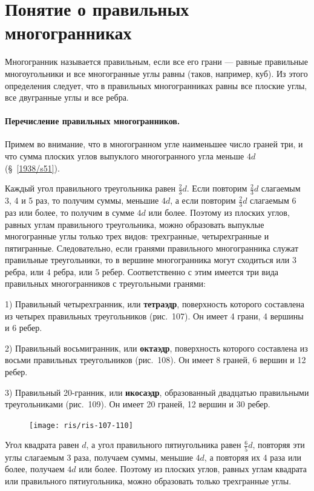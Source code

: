 \documentclass[twoside]{book}
\begin{document}
\section{Понятие о правильных многогранниках}

Многогранник называется правильным, если все его грани --- равные правильные многоугольники и все многогранные углы равны (таков, например, куб).
Из этого определения следует, что в правильных многогранниках равны все плоские углы, все двугранные углы и все ребра.

\paragraph{Перечисление правильных многогранников.}\label{1938/s97}
Примем во внимание, что в многогранном угле наименьшее число граней три, и что сумма плоских углов выпуклого многогранного угла меньше $4d$ (§~\ref{1938/s51}).

Каждый угол правильного треугольника равен $\tfrac23d$.
Если повторим  $\tfrac23d$ слагаемым 3, 4 и 5 раз, то получим суммы, меньшие $4d$, а если повторим  $\tfrac23d$ слагаемым 6 раз или более, то получим в сумме $4d$ или более.
Поэтому из плоских углов, равных углам правильного треугольника, можно образовать выпуклые многогранные углы только трех видов: трехгранные, четырехгранные и пятигранные.
Следовательно, если гранями правильного многогранника служат правильные треугольники, то в вершине многогранника могут сходиться или 3 ребра, или 4 ребра, или 5 ребер.
Соответственно с этим имеется три вида правильных многогранников с треугольными гранями:

1) Правильный четырехгранник, или \textbf{тетраэдр}, поверхность которого составлена из четырех правильных треугольников (рис.~107).
Он имеет 4 грани, 4 вершины и 6 ребер.

2) Правильный восьмигранник, или \textbf{октаэдр}, поверхность которого составлена из восьми правильных треугольников (рис.~108).
Он имеет 8 граней, 6 вершин и 12 ребер.

3) Правильный 20-гранник, или \textbf{икосаэдр}, образованный двадцатью правильными треугольниками (рис.~109).
Он имеет 20 граней, 12 вершин и 30 ребер.

\begin{figure}[h!]
\centering
\texttt{[image: ris/ris-107-110]}
\caption{}
\end{figure}

Угол квадрата равен $d$, а угол правильного пятиугольника равен  $\tfrac65d$, повторяя эти углы слагаемым 3 раза, получаем суммы, меньшие $4d$, а повторяя их 4 раза или более, получаем $4d$ или более.
Поэтому из плоских углов, равных углам квадрата или правильного пятиугольника, можно образовать только трехгранные углы.
\end{document}
